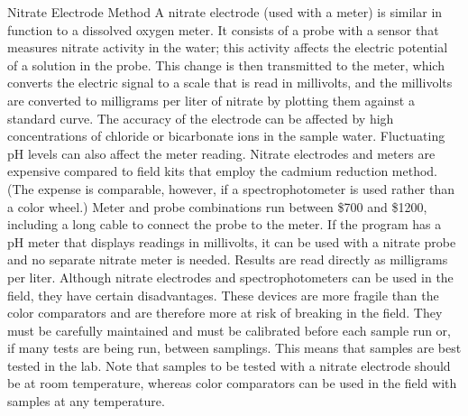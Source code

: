 \documentclass{article}
\begin{document}
Nitrate Electrode Method A nitrate electrode (used with a meter) is
similar in function to a dissolved oxygen meter. It consists of a probe
with a sensor that measures nitrate activity in the water; this activity
affects the electric potential of a solution in the probe. This change
is then transmitted to the meter, which converts the electric signal to
a scale that is read in millivolts, and the millivolts are converted to
milligrams per liter of nitrate by plotting them against a standard
curve. The accuracy of the electrode can be affected by high
concentrations of chloride or bicarbonate ions in the sample water.
Fluctuating pH levels can also affect the meter reading. Nitrate
electrodes and meters are expensive compared to field kits that employ
the cadmium reduction method. (The expense is comparable, however, if a
spectrophotometer is used rather than a color wheel.) Meter and probe
combinations run between \$700 and \$1200, including a long cable to
connect the probe to the meter. If the program has a pH meter that
displays readings in millivolts, it can be used with a nitrate probe and
no separate nitrate meter is needed. Results are read directly as
milligrams per liter. Although nitrate electrodes and spectrophotometers
can be used in the field, they have certain disadvantages. These devices
are more fragile than the color comparators and are therefore more at
risk of breaking in the field. They must be carefully maintained and
must be calibrated before each sample run or, if many tests are being
run, between samplings. This means that samples are best tested in the
lab. Note that samples to be tested with a nitrate electrode should be
at room temperature, whereas color comparators can be used in the field
with samples at any temperature.
\end{document}
